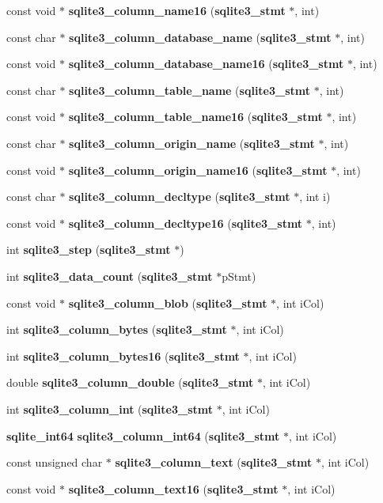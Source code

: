 \begin{DoxyCompactItemize}
\item 
const void $\ast$ {\bf sqlite3\_\-column\_\-name16} ({\bf sqlite3\_\-stmt} $\ast$, int)
\item 
const char $\ast$ {\bf sqlite3\_\-column\_\-database\_\-name} ({\bf sqlite3\_\-stmt} $\ast$, int)
\item 
const void $\ast$ {\bf sqlite3\_\-column\_\-database\_\-name16} ({\bf sqlite3\_\-stmt} $\ast$, int)
\item 
const char $\ast$ {\bf sqlite3\_\-column\_\-table\_\-name} ({\bf sqlite3\_\-stmt} $\ast$, int)
\item 
const void $\ast$ {\bf sqlite3\_\-column\_\-table\_\-name16} ({\bf sqlite3\_\-stmt} $\ast$, int)
\item 
const char $\ast$ {\bf sqlite3\_\-column\_\-origin\_\-name} ({\bf sqlite3\_\-stmt} $\ast$, int)
\item 
const void $\ast$ {\bf sqlite3\_\-column\_\-origin\_\-name16} ({\bf sqlite3\_\-stmt} $\ast$, int)
\item 
const char $\ast$ {\bf sqlite3\_\-column\_\-decltype} ({\bf sqlite3\_\-stmt} $\ast$, int i)
\item 
const void $\ast$ {\bf sqlite3\_\-column\_\-decltype16} ({\bf sqlite3\_\-stmt} $\ast$, int)
\item 
int {\bf sqlite3\_\-step} ({\bf sqlite3\_\-stmt} $\ast$)
\item 
int {\bf sqlite3\_\-data\_\-count} ({\bf sqlite3\_\-stmt} $\ast$pStmt)
\item 
const void $\ast$ {\bf sqlite3\_\-column\_\-blob} ({\bf sqlite3\_\-stmt} $\ast$, int iCol)
\item 
int {\bf sqlite3\_\-column\_\-bytes} ({\bf sqlite3\_\-stmt} $\ast$, int iCol)
\item 
int {\bf sqlite3\_\-column\_\-bytes16} ({\bf sqlite3\_\-stmt} $\ast$, int iCol)
\item 
double {\bf sqlite3\_\-column\_\-double} ({\bf sqlite3\_\-stmt} $\ast$, int iCol)
\item 
int {\bf sqlite3\_\-column\_\-int} ({\bf sqlite3\_\-stmt} $\ast$, int iCol)
\item 
{\bf sqlite\_\-int64} {\bf sqlite3\_\-column\_\-int64} ({\bf sqlite3\_\-stmt} $\ast$, int iCol)
\item 
const unsigned char $\ast$ {\bf sqlite3\_\-column\_\-text} ({\bf sqlite3\_\-stmt} $\ast$, int iCol)
\item 
const void $\ast$ {\bf sqlite3\_\-column\_\-text16} ({\bf sqlite3\_\-stmt} $\ast$, int iCol)
\item 

\end{DoxyCompactItemize}
